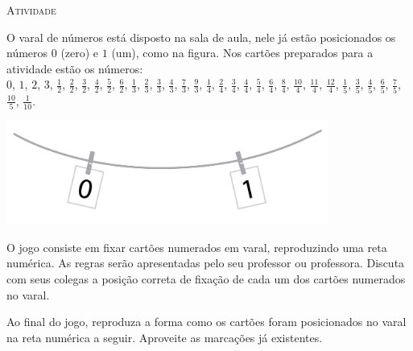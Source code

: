 \documentclass[10 pt,usenames,dvipsnames, oneside]{article}
\begin{document}
\bigskip
\begin{center}
{\large \scshape Atividade}
\end{center}
\fi

O varal de números está disposto na sala de aula, nele já estão posicionados os números $0$ (zero) e $1$ (um), como na figura. Nos cartões preparados para a atividade estão os números: \\
$0$, $1$, $2$, $3$, $\frac{1}{2}$, $\frac{2}{2}$, $\frac{3}{2}$, $\frac{4}{2}$, $\frac{5}{2}$, $\frac{6}{2}$,
$\frac{1}{3}$, $\frac{2}{3}$, $\frac{3}{3}$, $\frac{4}{3}$, $\frac{7}{3}$, $\frac{9}{3}$,
$\frac{1}{4}$, $\frac{2}{4}$, $\frac{3}{4}$, $\frac{4}{4}$, $\frac{5}{4}$, $\frac{6}{4}$, $\frac{8}{4}$, $\frac{10}{4}$, $\frac{11}{4}$, $\frac{12}{4}$,
$\frac{1}{5}$, $\frac{3}{5}$, $\frac{4}{5}$, $\frac{6}{5}$, $\frac{7}{5}$, $\frac{10}{5}$,
$\frac{1}{10}$.

\begin{center}
\includegraphics[width=300pt, keepaspectratio]{ativ11_fig01.png}
\end{center}


O jogo consiste em fixar cartões numerados em varal, reproduzindo uma reta numérica. As regras serão apresentadas pelo seu professor ou professora. Discuta com seus colegas a posição correta de fixação de cada um dos cartões numerados no varal.

Ao final do jogo, reproduza a forma como os cartões foram posicionados no varal na reta numérica a seguir. Aproveite as marcações já existentes.

\begin{center}
\end{center}
\end{document}
